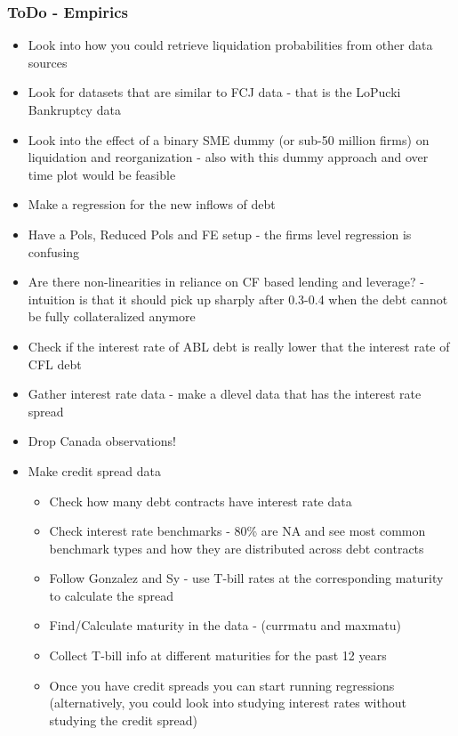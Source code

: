\documentclass[12pt]{article}
\begin{document}
\subsubsection*{ToDo - Empirics}
\begin{itemize}\setlength\itemsep{0em} \small
    \item Look into how you could retrieve liquidation probabilities from other data sources \checkmark
    \item Look for datasets that are similar to FCJ data - that is the LoPucki Bankruptcy data \checkmark
    \item Look into the effect of a binary SME dummy (or sub-50 million firms) on liquidation and reorganization - also with this dummy approach and over time plot would be feasible \checkmark
    \item Make a regression for the new inflows of debt \checkmark
    \item Have a Pols, Reduced Pols and FE  setup - the firms level regression is confusing
    \item Are there non-linearities in reliance on CF based lending and leverage? - intuition is that it should pick up sharply after 0.3-0.4 when the debt cannot be fully collateralized anymore 
    \item Check if the interest rate of ABL debt is really lower that the interest rate of CFL debt \checkmark
    \item Gather interest rate data - make a dlevel data that has the interest rate spread \checkmark
    \item Drop Canada observations! \checkmark
    \item Make credit spread data \checkmark
    \begin{itemize} 
        \item Check how many debt contracts have interest rate data \checkmark
        \item Check interest rate benchmarks - 80\% are NA and see most common benchmark types and how they are distributed across debt contracts  \checkmark
        \item Follow Gonzalez and Sy - use T-bill rates at the corresponding maturity to calculate the spread \checkmark
        \item Find/Calculate maturity in the data - (currmatu and maxmatu) \checkmark
        \item Collect T-bill info at different maturities for the past 12 years \checkmark
        \item Once you have credit spreads you can start running regressions (alternatively, you could look into studying interest rates without studying the credit spread) \checkmark

\end{itemize}
\end{itemize}
\end{document}
